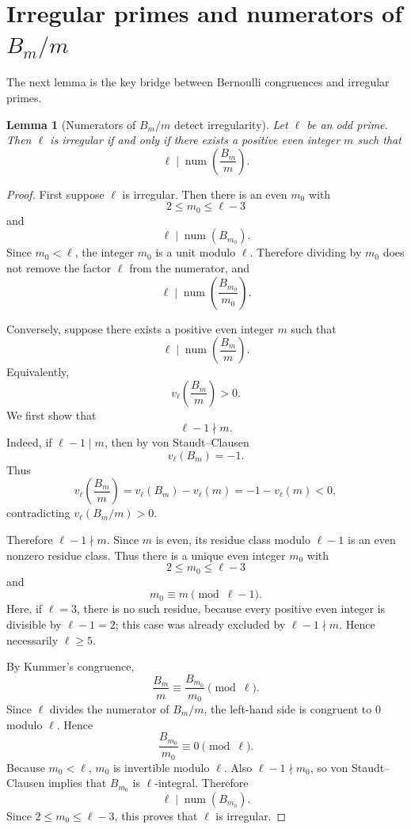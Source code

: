 \documentclass[11pt]{article}
\newtheorem{lemma}[theorem]{Lemma}
\newcommand{\num}{\operatorname{num}}
\begin{document}
\section{Irregular primes and numerators of $B_m/m$}

The next lemma is the key bridge between Bernoulli congruences and irregular primes.

\begin{lemma}[Numerators of $B_m/m$ detect irregularity]\label{lem:detect-irregular}
Let $\ell$ be an odd prime.  Then $\ell$ is irregular if and only if there exists a positive even integer $m$ such that
\[
  \ell\mid \num\left(\frac{B_m}{m}\right).
\]
\end{lemma}

\begin{proof}
First suppose $\ell$ is irregular.  Then there is an even $m_0$ with
\[
  2\le m_0\le \ell-3
\]
and
\[
  \ell\mid \num(B_{m_0}).
\]
Since $m_0<\ell$, the integer $m_0$ is a unit modulo $\ell$.  Therefore dividing by $m_0$ does not remove the factor $\ell$ from the numerator, and
\[
  \ell\mid \num\left(\frac{B_{m_0}}{m_0}\right).
\]

Conversely, suppose there exists a positive even integer $m$ such that
\[
  \ell\mid \num\left(\frac{B_m}{m}\right).
\]
Equivalently,
\[
  v_\ell\left(\frac{B_m}{m}\right)>0.
\]
We first show that
\[
  \ell-1\nmid m.
\]
Indeed, if $\ell-1\mid m$, then by von Staudt--Clausen
\[
  v_\ell(B_m)=-1.
\]
Thus
\[
  v_\ell\left(\frac{B_m}{m}\right)
  =v_\ell(B_m)-v_\ell(m)
  =-1-v_\ell(m)<0,
\]
contradicting $v_\ell(B_m/m)>0$.

Therefore $\ell-1\nmid m$.  Since $m$ is even, its residue class modulo $\ell-1$ is an even nonzero residue class.  Thus there is a unique even integer $m_0$ with
\[
  2\le m_0\le \ell-3
\]
and
\[
  m_0\equiv m\pmod{\ell-1}.
\]
Here, if $\ell=3$, there is no such residue, because every positive even integer is divisible by $\ell-1=2$; this case was already excluded by $\ell-1\nmid m$.  Hence necessarily $\ell\ge5$.

By Kummer's congruence,
\[
  \frac{B_m}{m}\equiv \frac{B_{m_0}}{m_0}\pmod\ell.
\]
Since $\ell$ divides the numerator of $B_m/m$, the left-hand side is congruent to $0$ modulo $\ell$.  Hence
\[
  \frac{B_{m_0}}{m_0}\equiv0\pmod\ell.
\]
Because $m_0<\ell$, $m_0$ is invertible modulo $\ell$.  Also $\ell-1\nmid m_0$, so von Staudt--Clausen implies that $B_{m_0}$ is $\ell$-integral.  Therefore
\[
  \ell\mid \num(B_{m_0}).
\]
Since $2\le m_0\le\ell-3$, this proves that $\ell$ is irregular.
\end{proof}
\end{document}
